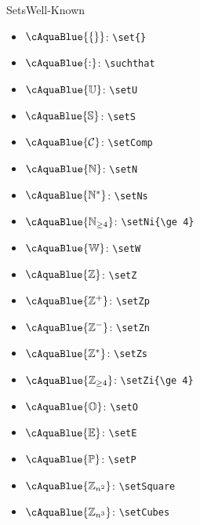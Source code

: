 \documentclass[aspectratio=169, sectionpages]{beamer}
\begin{document}
\begin{frame}[fragile]{Sets}{Well-Known}
	\hfill\\
	\begin{minipage}[t]{0.3\textwidth}
		\vspace{0pt}
		\begin{itemize}
			\item \(\cAquaBlue{ \set{} } \): \verb!\set{}!
			\item \(\cAquaBlue{ \suchthat } \): \verb!\suchthat!
			\item \(\cAquaBlue{ \setU } \): \verb!\setU!
			\item \(\cAquaBlue{ \setS } \): \verb!\setS!
			\item \(\cAquaBlue{ \setComp } \): \verb!\setComp!
			\item \(\cAquaBlue{ \setN } \): \verb!\setN!
			\item \(\cAquaBlue{ \setNs } \): \verb!\setNs!
			\item \(\cAquaBlue{ \setNi{\ge 4} } \): \verb!\setNi{\ge 4}!
			\item \(\cAquaBlue{ \setW } \): \verb!\setW!
		\end{itemize}
	\end{minipage}
	\begin{minipage}[t]{0.3\textwidth}
		\vspace{0pt}
		\begin{itemize}
			\item \(\cAquaBlue{ \setZ } \): \verb!\setZ!
			\item \(\cAquaBlue{ \setZp } \): \verb!\setZp!
			\item \(\cAquaBlue{ \setZn } \): \verb!\setZn!
			\item \(\cAquaBlue{ \setZs } \): \verb!\setZs!
			\item \(\cAquaBlue{ \setZi{\ge 4} } \): \verb!\setZi{\ge 4}!
			\item \(\cAquaBlue{ \setO } \): \verb!\setO!
			\item \(\cAquaBlue{ \setE } \): \verb!\setE!
			\item \(\cAquaBlue{ \setP } \): \verb!\setP!
			\item \(\cAquaBlue{ \setSquares } \): \verb!\setSquare!
			\item \(\cAquaBlue{ \setCubes } \): \verb!\setCubes!
		\end{itemize}
	\end{minipage}

\end{frame}
\end{document}
